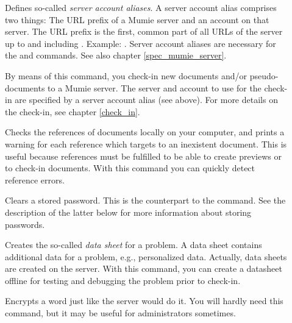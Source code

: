 \documentclass{generic}
\begin{document}
\begin{description}

\item[]

  Defines so-called \emph{server account aliases}. A server account alias
  comprises two things: The URL prefix of a Mumie server and an account on
  that server. The URL prefix is the first, common part of all URLs of the
  server up to and including . Example:
  . Server account aliases are necessary for
  the  and  commands. See also chapter
  \ref{spec_mumie_server}.

\item[]

  By means of this command, you check-in new documents and/or pseudo-documents
  to a Mumie server. The server and account to use for the check-in are
  specified by a server account alias (see above). For more details on the
  check-in, see chapter \ref{check_in}.

\item[]

  Checks the references of documents locally on your computer, and prints a
  warning for each reference which targets to an inexistent document. This is
  useful because references must be fulfilled to be able to create previews or
  to check-in documents. With this command you can quickly detect reference
  errors.

\item[]

  Clears a stored password. This is the counterpart to the 
  command. See the description of the latter below for more information about
  storing passwords.

\item[]

  Creates the so-called \emph{data sheet} for a problem. A data sheet contains
  additional data for a problem, e.g., personalized data. Actually, data sheets
  are created on the server. With this command, you can create a datasheet
  offline for testing and debugging the problem prior to check-in.

\item[]

  Encrypts a word just like the server would do it. You will hardly need this
  command, but it may be useful for administrators sometimes.


\end{description}
\end{document}
